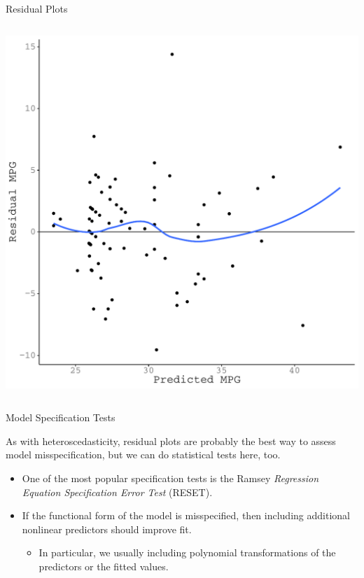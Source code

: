 \documentclass{beamer}\usepackage[]{graphicx}\usepackage[]{color}
\makeatletter
\def\maxwidth{ %
  \ifdim\Gin@nat@width>\linewidth
    \linewidth
  \else
    \Gin@nat@width
  \fi
}
\newenvironment{knitrout}{}{} %
\makeatother
\begin{document}
\begin{frame}{Residual Plots}
\begin{columns}
\begin{column}{0.5\textwidth}
\begin{knitrout}
{\centering \includegraphics[width=\maxwidth]{figure/unnamed-chunk-19-1} 

}



\end{knitrout}

\end{column}
\end{columns}
  
\end{frame}

\watermarkon %

\begin{frame}{Model Specification Tests}
  
  As with heteroscedasticity, residual plots are probably the best way to assess 
  model misspecification, but we can do statistical tests here, too.
  \vb
  \begin{itemize}
  \item One of the most popular specification tests is the Ramsey 
    \emph{Regression Equation Specification Error Test} (RESET).
    \vb
  \item If the functional form of the model is misspecified, then including 
    additional nonlinear predictors should improve fit.
    \vc
    \begin{itemize}
    \item In particular, we usually including polynomial transformations of the 
      predictors or the fitted values.
    \end{itemize}
  \end{itemize}
  
\end{frame}
\end{document}
